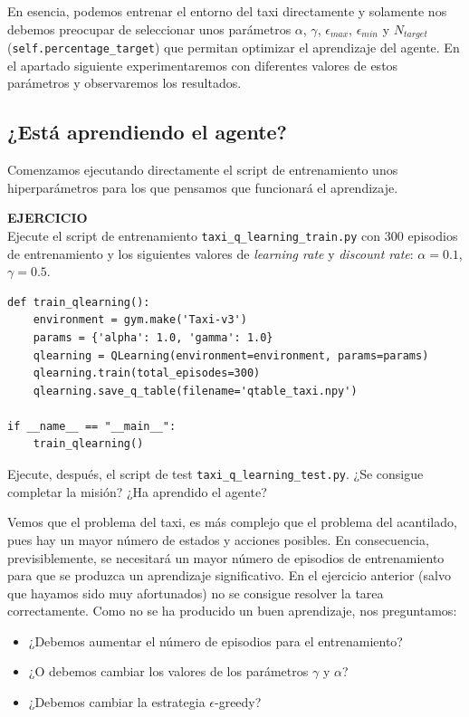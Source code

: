 \documentclass{article}
\begin{document}
En esencia, podemos entrenar el entorno del taxi directamente y solamente nos debemos preocupar de seleccionar unos parámetros $\alpha$, $\gamma$, $\epsilon_{max}$, $\epsilon_{min}$ y $N_{target}$ (\texttt{self.percentage\_target}) que permitan optimizar el aprendizaje del agente. En el apartado siguiente experimentaremos con diferentes valores de estos parámetros y observaremos los resultados.


\subsection{¿Está aprendiendo el agente?}
Comenzamos ejecutando directamente el script de entrenamiento unos hiperparámetros para los que pensamos que funcionará el aprendizaje.

\begin{exercise}
\textbf{EJERCICIO}\\
    Ejecute el script de entrenamiento \texttt{taxi\_q\_learning\_train.py} con 300 episodios de entrenamiento y los siguientes valores de \textit{learning rate} y \textit{discount rate}: $\alpha=0.1$, $\gamma=0.5$. 
\begin{verbatim}
def train_qlearning():
    environment = gym.make('Taxi-v3')
    params = {'alpha': 1.0, 'gamma': 1.0}
    qlearning = QLearning(environment=environment, params=params)
    qlearning.train(total_episodes=300)
    qlearning.save_q_table(filename='qtable_taxi.npy')
    
if __name__ == "__main__":
    train_qlearning()    
\end{verbatim}
Ejecute, después, el script de test \texttt{taxi\_q\_learning\_test.py}. ¿Se consigue completar la misión? ¿Ha aprendido el agente?
\end{exercise}

Vemos que el problema del taxi, es más complejo que el problema del acantilado, pues hay un mayor número de estados y acciones posibles. En consecuencia, previsiblemente, se necesitará un mayor número de episodios de entrenamiento para que se produzca un aprendizaje significativo. En el ejercicio anterior (salvo que hayamos sido muy afortunados) no se consigue resolver la tarea correctamente. Como no se ha producido un buen aprendizaje, nos preguntamos:
\begin{itemize}
    \item ¿Debemos aumentar el número de episodios para el entrenamiento?
    \item ¿O debemos cambiar los valores de los parámetros $\gamma$ y $\alpha$?    
    \item ¿Debemos cambiar la estrategia $\epsilon$-greedy?    
\end{itemize}
\end{document}
